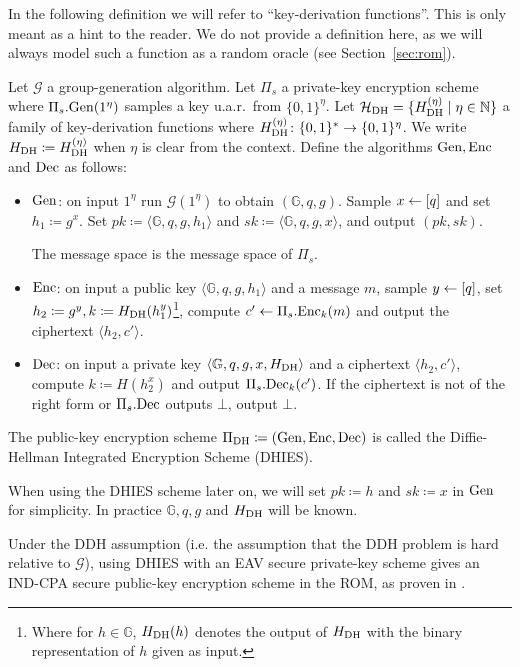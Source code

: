In the following definition we will refer to ``key-derivation functions''. This is only meant as a hint to the reader. We do not provide a definition here, as we will always model such a function as a random oracle (see Section~\ref{sec:rom}).

\begin{definition}
	Let $\mathcal{G}$ a group-generation algorithm. Let $\Pi_s$ a private-key encryption scheme where $\Pi_s.\mathrm{Gen}(1^\eta)$ samples a key u.a.r.\ from $\{0, 1\}^\eta$. Let $\mathcal{H}_\mathrm{DH} = \{H_\mathrm{DH}^{(\eta)} \mid \eta \in \mathbb{N} \}$ a family of key-derivation functions where $H_\mathrm{DH}^{(\eta)} \colon \{0, 1\}^* \to \{0, 1\}^{\eta}$. We write $H_\mathrm{DH} \coloneqq H_\mathrm{DH}^{(\eta)}$ when $\eta$ is clear from the context. Define the algorithms $\mathrm{Gen}, \mathrm{Enc}$ and $\mathrm{Dec}$ as follows:
	\begin{itemize}
		\item $\mathrm{Gen}$: on input $1^\eta$ run $\mathcal{G}(1^\eta)$ to obtain $(\mathbb{G}, q, g)$. Sample $x \leftarrow [q]$ and set $h_1 \coloneqq g^x$. Set $pk \coloneqq \langle \mathbb{G}, q, g, h_1 \rangle$ and $sk \coloneqq \langle \mathbb{G}, q, g, x \rangle$, and output $(pk, sk)$.

		      The message space is the message space of $\Pi_s$.
		\item $\mathrm{Enc}$: on input a public key $\langle \mathbb{G}, q, g, h_1 \rangle$ and a message $m$, sample $y \leftarrow [q]$, set $h_2 \coloneqq g^y, k \coloneqq H_\mathrm{DH}(h_1^y)$\footnote{Where for $h \in \mathbb{G}$, $H_\mathrm{DH}(h)$ denotes the output of $H_\mathrm{DH}$ with the binary representation of $h$ given as input.}, compute $c' \leftarrow \Pi_s.\mathrm{Enc}_k(m)$ and output the ciphertext $\langle h_2, c' \rangle$.
		\item $\mathrm{Dec}$: on input a private key $\langle \mathbb{G}, q, g, x, H_\mathrm{DH} \rangle$ and a ciphertext $\langle h_2, c' \rangle$, compute $k \coloneqq H(h_2^x)$ and output $\Pi_s.\mathrm{Dec}_k(c')$. If the ciphertext is not of the right form or $\Pi_s.\mathrm{Dec}$ outputs $\bot$, output $\bot$.
	\end{itemize}
	The public-key encryption scheme $\Pi_{\mathrm{DH}} \coloneqq (\mathrm{Gen}, \mathrm{Enc}, \mathrm{Dec})$ is called the Diffie-Hellman Integrated Encryption Scheme (DHIES).

	When using the DHIES scheme later on, we will set $pk \coloneqq h $ and $sk \coloneqq x$ in $\mathrm{Gen}$ for simplicity. In practice $\mathbb{G}, q, g$ and $H_\mathrm{DH}$ will be known.
\end{definition}

Under the DDH assumption (i.e. the assumption that the DDH problem is hard relative to $\mathcal{G}$), using DHIES with an EAV secure private-key scheme gives an IND-CPA secure public-key encryption scheme in the ROM, as proven in \cite[Theorem~12.12]{introduction-to-modern-cryptography}.
